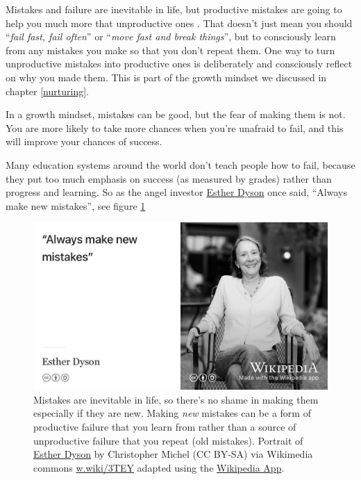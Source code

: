 \documentclass[
]{book}
\begin{document}
Mistakes and failure are inevitable in life, but productive mistakes are going to help you much more that unproductive ones \citep{henrypetroski}. That doesn't just mean you should ``\emph{fail fast, fail often}'' \citep{failfast} or ``\emph{move fast and break things}'', but to consciously learn from any mistakes you make so that you don't repeat them. One way to turn unproductive mistakes into productive ones is deliberately and consciously reflect on why you made them. This is part of the growth mindset we discussed in chapter \ref{nurturing}.

In a growth mindset, mistakes can be good, but the fear of making them is not. You are more likely to take more chances when you're unafraid to fail, and this will improve your chances of success.

Many education systems around the world don't teach people how to fail, because they put too much emphasis on success (as measured by grades) rather than progress and learning. \citep{failgift} So as the angel investor \href{https://en.wikipedia.org/wiki/Esther_Dyson}{Esther Dyson} once said, ``Always make new mistakes'', see figure \ref{fig:esther-dyson-fig}

\begin{figure}

{\centering \includegraphics[width=1\linewidth]{images/esther-dyson-always-make-new-mistakes} 

}

\caption{Mistakes are inevitable in life, so there's no shame in making them especially if they are new. Making \emph{new} mistakes can be a form of productive failure that you learn from rather than a source of unproductive failure that you repeat (old mistakes). Portrait of \href{https://en.wikipedia.org/wiki/Esther_Dyson}{Esther Dyson} by Christopher Michel (CC BY-SA) via Wikimedia commons \href{https://w.wiki/3TEY}{w.wiki/3TEY} adapted using the \href{https://apps.apple.com/gb/app/wikipedia/id324715238}{Wikipedia App}.}\label{fig:esther-dyson-fig}
\end{figure}
\end{document}
